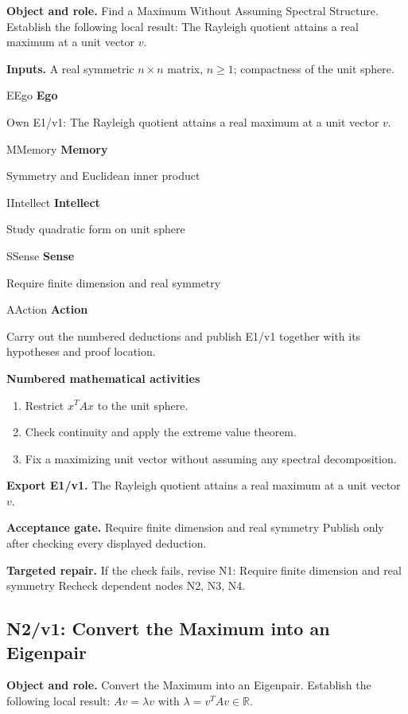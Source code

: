 \documentclass[preprint,12pt,aps,pra,showkeys,amsmath,amssymb,superscriptaddress,floatfix]{revtex4-2}
\theoremstyle{definition}
\theoremstyle{remark}
\newcommand{\mmfaculty}[3]{%
 \begin{mmfacultybox}{#1}{#2}
 {\sffamily\bfseries\color{MMBlue}#2}\par\smallskip #3
 \end{mmfacultybox}}
\newcommand{\field}[2]{\par\smallskip\noindent\textbf{#1.} #2\par}
\begin{document}
\field{Object and role}{Find a Maximum Without Assuming Spectral Structure. Establish the
following local result: The Rayleigh quotient attains a real maximum at
a unit vector \(v\).}

\field{Inputs}{A real symmetric \(n\times n\) matrix, \(n\ge1\); compactness of the
unit sphere.}

\mmfaculty{E}{Ego}{Own E1/v1: The Rayleigh quotient attains a real maximum at a unit vector
\(v\).}

\mmfaculty{M}{Memory}{Symmetry and Euclidean inner product}

\mmfaculty{I}{Intellect}{Study quadratic form on unit sphere}

\mmfaculty{S}{Sense}{Require finite dimension and real symmetry}

\mmfaculty{A}{Action}{Carry out the numbered deductions and publish E1/v1 together with its
hypotheses and proof location.}

\smallskip\noindent\textbf{Numbered mathematical activities}

\begin{enumerate}[label=N1.\arabic*,leftmargin=3.4em]

\item Restrict \(x^TAx\) to the unit sphere.

\item Check continuity and apply the extreme value theorem.

\item Fix a maximizing unit vector without assuming any spectral
decomposition.

\end{enumerate}

\field{Export E1/v1}{The Rayleigh quotient attains a real maximum at a unit vector \(v\).}

\field{Acceptance gate}{Require finite dimension and real symmetry Publish only after checking
every displayed deduction.}

\field{Targeted repair}{If the check fails, revise N1: Require finite dimension and real
symmetry Recheck dependent nodes N2, N3, N4.}

\clearpage

\subsection{N2/v1: Convert the Maximum into an Eigenpair}

\field{Object and role}{Convert the Maximum into an Eigenpair. Establish the following local
result: \(Av=\lambda v\) with \(\lambda=v^TAv\in\mathbb R\).}
\end{document}
